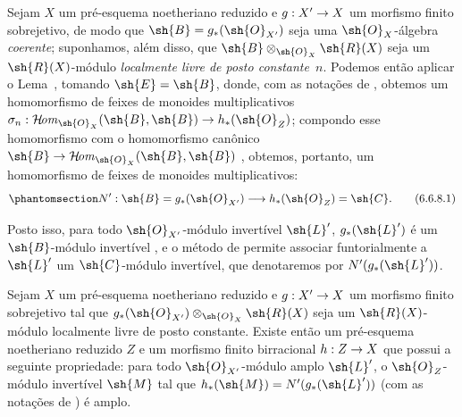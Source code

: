 \documentclass[oneside,10pt]{amsart}
\makeatletter
\newcommand{\ega@arrow}[2]{\mathchoice{#1}{#2}{#2}{#2}}
\renewcommand{\to}{\ega@arrow{\longrightarrow}{\rightarrow}}
\def\shHom{\mathcal{H}\!\mathit{om}}
\let\EGAOriginalLabel\label
\renewcommand{\label}[1]{\phantomsection\EGAOriginalLabel{#1}}
\makeatother
\begin{document}
\begin{env}[6.6.8]
\label{II.6.6.8}
Sejam $X$ um pré-esquema noetheriano reduzido e $g:X'\to X$ um morfismo finito sobrejetivo, de modo que $\sh{B}=g_*(\sh{O}_{X'})$ seja uma $\sh{O}_X$-álgebra \emph{coerente};
suponhamos, além disso, que $\sh{B}\otimes_{\sh{O}_X}\sh{R}(X)$ seja um $\sh{R}(X)$-módulo \emph{localmente livre de posto constante~$n$}.
Podemos então aplicar o Lema~, tomando $\sh{E}=\sh{B}$, donde, com as notações de , obtemos um homomorfismo de feixes de monoides multiplicativos $\sigma_n:\shHom_{\sh{O}_X}(\sh{B},\sh{B})\to h_*(\sh{O}_Z)$; compondo esse homomorfismo com o homomorfismo canônico $\sh{B}\to\shHom_{\sh{O}_X}(\sh{B},\sh{B})$ , obtemos, portanto, um homomorfismo de feixes de monoides multiplicativos:
\[
\label{II.6.6.8.1}
  N' : \sh{B} = g_*(\sh{O}_{X'}) \to h_*(\sh{O}_Z) = \sh{C}.
\tag{6.6.8.1}
\]

Posto isso, para todo $\sh{O}_{X'}$-módulo invertível $\sh{L}'$, $g_*(\sh{L}')$ é um $\sh{B}$-módulo invertível , e o método de  permite associar funtorialmente a $\sh{L}'$ um $\sh{C}$-módulo invertível, que denotaremos por $N'(g_*(\sh{L}'))$.
\end{env}

\begin{lemma}[6.6.9]
\label{II.6.6.9}
Sejam $X$ um pré-esquema noetheriano reduzido e $g:X'\to X$ um morfismo finito sobrejetivo tal que $g_*(\sh{O}_{X'})\otimes_{\sh{O}_X}\sh{R}(X)$ seja um $\sh{R}(X)$-módulo localmente livre de posto constante.
Existe então um pré-esquema noetheriano reduzido $Z$ e um morfismo finito birracional $h:Z\to X$ que possui a seguinte propriedade: para todo $\sh{O}_{X'}$-módulo amplo $\sh{L}'$, o $\sh{O}_Z$-módulo invertível $\sh{M}$ tal que $h_*(\sh{M})=N'(g_*(\sh{L}'))$ (com as notações de ) é amplo.
\end{lemma}
\end{document}
